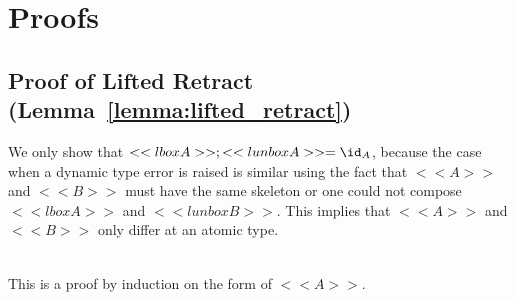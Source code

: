 \section{Proofs}
\label{sec:proofs}

\subsection{Proof of Lifted Retract (Lemma~\ref{lemma:lifted_retract})}
\label{subsec:proof_of_lifted_retract}
We only show that $<<lbox A>>;<<lunbox A>> = \id_A$, because the case
when a dynamic type error is raised is similar using the fact that
$<<A>>$ and $<<B>>$ must have the same skeleton or one could not
compose $<<lbox A>>$ and $<<lunbox B>>$. This implies that $<<A>>$ and
$<<B>>$ only differ at an atomic type.

\ \\
\noindent
This is a proof by induction on the form of $<<A>>$.

